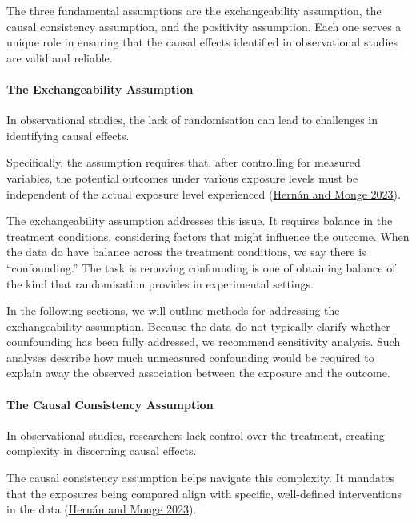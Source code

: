 \documentclass[
  singlecolumn]{article}
\let\oldparagraph\paragraph
\renewcommand{\paragraph}[1]{\oldparagraph{#1}\mbox{}}
\begin{document}
The three fundamental assumptions are the exchangeability assumption,
the causal consistency assumption, and the positivity assumption. Each
one serves a unique role in ensuring that the causal effects identified
in observational studies are valid and reliable.

\hypertarget{the-exchangeability-assumption}{%
\paragraph{\texorpdfstring{\textbf{The Exchangeability
Assumption}}{The Exchangeability Assumption}}\label{the-exchangeability-assumption}}

In observational studies, the lack of randomisation can lead to
challenges in identifying causal effects.

Specifically, the assumption requires that, after controlling for
measured variables, the potential outcomes under various exposure levels
must be independent of the actual exposure level experienced
(\protect\hyperlink{ref-hernuxe1n2023}{Hernán and Monge 2023}).

The exchangeability assumption addresses this issue. It requires balance
in the treatment conditions, considering factors that might influence
the outcome. When the data do have balance across the treatment
conditions, we say there is ``confounding.'' The task is removing
confounding is one of obtaining balance of the kind that randomisation
provides in experimental settings.

In the following sections, we will outline methods for addressing the
exchangeability assumption. Because the data do not typically clarify
whether counfounding has been fully addressed, we recommend sensitivity
analysis. Such analyses describe how much unmeasured confounding would
be required to explain away the observed association between the
exposure and the outcome.

\hypertarget{the-causal-consistency-assumption}{%
\paragraph{\texorpdfstring{\textbf{The Causal Consistency
Assumption}}{The Causal Consistency Assumption}}\label{the-causal-consistency-assumption}}

In observational studies, researchers lack control over the treatment,
creating complexity in discerning causal effects.

The causal consistency assumption helps navigate this complexity. It
mandates that the exposures being compared align with specific,
well-defined interventions in the data
(\protect\hyperlink{ref-hernuxe1n2023}{Hernán and Monge 2023}).
\end{document}
